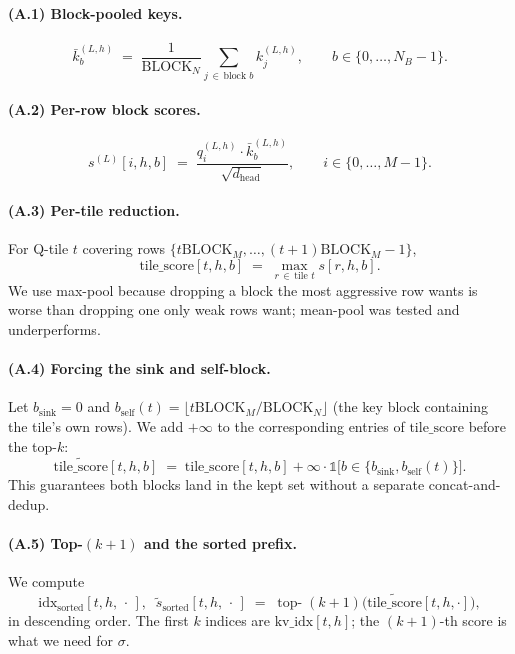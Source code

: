 \documentclass[11pt]{article}
\theoremstyle{remark}
\newcommand{\NB}{N_{\!B}}
\newcommand{\dhead}{d_{\text{head}}}
\newcommand{\BlockM}{\text{BLOCK}_M}
\newcommand{\BlockN}{\text{BLOCK}_N}
\begin{document}
\paragraph{(A.1) Block-pooled keys.}
\begin{equation}
\bar k_b^{(L,h)} \;=\; \frac{1}{\BlockN}\sum_{j\,\in\,\text{block }b} k_j^{(L,h)}, \qquad b \in \{0,\dots,\NB-1\}.
\end{equation}

\paragraph{(A.2) Per-row block scores.}
\begin{equation}
s^{(L)}[i,h,b] \;=\; \frac{q_i^{(L,h)} \cdot \bar k_b^{(L,h)}}{\sqrt{\dhead}}, \qquad i \in \{0,\dots,M-1\}.
\end{equation}

\paragraph{(A.3) Per-tile reduction.} For Q-tile $t$ covering rows $\{t\BlockM, \dots, (t{+}1)\BlockM{-}1\}$,
\begin{equation}
\text{tile\_score}[t,h,b] \;=\; \max_{r \,\in\, \text{tile }t} s[r,h,b].
\end{equation}
We use max-pool because dropping a block the most aggressive row wants is worse than dropping one only weak rows want; mean-pool was tested and underperforms.

\paragraph{(A.4) Forcing the sink and self-block.} Let $b_{\text{sink}} = 0$ and $b_{\text{self}}(t) = \lfloor t\BlockM/\BlockN \rfloor$ (the key block containing the tile's own rows). We add $+\infty$ to the corresponding entries of $\text{tile\_score}$ before the top-$k$:
\begin{equation}
\widetilde{\text{tile\_score}}[t,h,b] \;=\; \text{tile\_score}[t,h,b] + \infty\cdot\mathbb{1}\!\bigl[b \in \{b_{\text{sink}}, b_{\text{self}}(t)\}\bigr].
\end{equation}
This guarantees both blocks land in the kept set without a separate concat-and-dedup.

\paragraph{(A.5) Top-$(k{+}1)$ and the sorted prefix.} We compute
\begin{equation}
\text{idx}_{\text{sorted}}[t,h,\,\cdot\,], \;\;\widetilde{s}_{\text{sorted}}[t,h,\,\cdot\,] \;=\; \operatorname*{top-}{(k{+}1)}\!\bigl(\widetilde{\text{tile\_score}}[t,h,\cdot]\bigr),
\end{equation}
in descending order. The first $k$ indices are $\text{kv\_idx}[t,h]$; the $(k{+}1)$-th score is what we need for $\sigma$.
\end{document}
